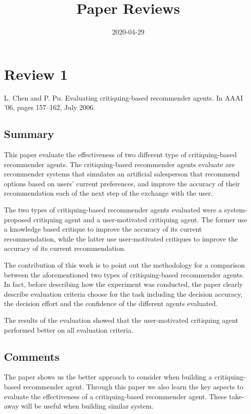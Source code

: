 \documentclass{article}
\begin{document}
\title{Paper Reviews}
\date{2020-04-29}
\maketitle

\section*{Review 1}
L. Chen and P. Pu. Evaluating critiquing-based recommender agents. 
In AAAI ’06, pages 157–162, July 2006.

\subsection*{Summary}

This paper evaluate the effectiveness of two different type of critiquing-based
recommender agents. The critiquing-based recommender agents evaluate are
recommender systems that simulates an artificial salesperson that recommend
options based on users’ current preferences, and improve the accuracy of their
recommendation each of the next step of the exchange with the user.

The two types of critiquing-based recommender agents evaluated were a 
system-proposed critiquing agent and a user-motivated critiquing agent.
The former use a knowledge based critique to improve the accuracy of its
current recommendation, while the latter use user-motivated critiques to
improve the accuracy of its current recommendation.

The contribution of this work is to point out the methodology for a
comparison between the aforementioned two types of critiquing-based
recommender agents. In fact, before describing how the experiment was
conducted, the paper clearly describe evaluation criteria choose for 
the task including the decision accuracy, the decision effort and the
confidence of the different agents evaluated.

The results of the evaluation showed that the user-motivated critiquing
agent performed better on all evaluation criteria.


\subsection*{Comments}

The paper shows us the better approach to consider when building a critiquing-based recommender agent. Through this paper we also learn the key aspects to evaluate the effectiveness of a critiquing-based recommender agent. These take-away will be useful when building similar system.
\end{document}
